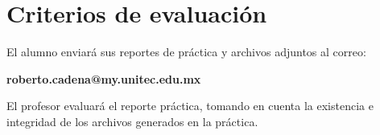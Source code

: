 \section{Criterios de evaluación}

	El alumno enviará sus reportes de práctica y archivos adjuntos al correo:

	\begin{center}
		\textbf{roberto.cadena@my.unitec.edu.mx} \\
	\end{center}

	El profesor evaluará el reporte práctica, tomando en cuenta la existencia e integridad de los archivos generados en la práctica.



